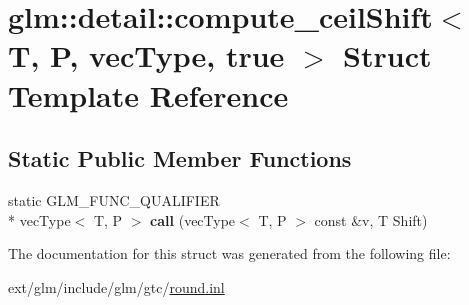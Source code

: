 \hypertarget{structglm_1_1detail_1_1compute__ceil_shift_3_01_t_00_01_p_00_01vec_type_00_01true_01_4}{\section{glm\-:\-:detail\-:\-:compute\-\_\-ceil\-Shift$<$ T, P, vec\-Type, true $>$ Struct Template Reference}
\label{structglm_1_1detail_1_1compute__ceil_shift_3_01_t_00_01_p_00_01vec_type_00_01true_01_4}
}
\subsection*{Static Public Member Functions}
\begin{DoxyCompactItemize}
\item 
\hypertarget{structglm_1_1detail_1_1compute__ceil_shift_3_01_t_00_01_p_00_01vec_type_00_01true_01_4_ae120f08254abe3447d5f3310138fc6a3}{static G\-L\-M\-\_\-\-F\-U\-N\-C\-\_\-\-Q\-U\-A\-L\-I\-F\-I\-E\-R \\*
vec\-Type$<$ T, P $>$ {\bfseries call} (vec\-Type$<$ T, P $>$ const \&v, T Shift)}\label{structglm_1_1detail_1_1compute__ceil_shift_3_01_t_00_01_p_00_01vec_type_00_01true_01_4_ae120f08254abe3447d5f3310138fc6a3}

\end{DoxyCompactItemize}


The documentation for this struct was generated from the following file\-:\begin{DoxyCompactItemize}
\item 
ext/glm/include/glm/gtc/\hyperlink{round_8inl}{round.\-inl}\end{DoxyCompactItemize}

